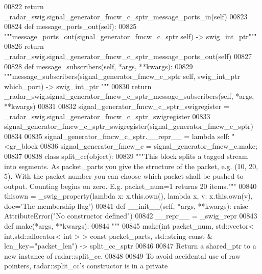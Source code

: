 \begin{DoxyCode}
{{{{00822         \textcolor{keywordflow}{return} \_radar\_swig.signal\_generator\_fmcw\_c\_sptr\_message\_ports\_in(self)
00823 
00824     \textcolor{keyword}{def }message_ports_out(self):
00825         \textcolor{stringliteral}{"""message\_ports\_out(signal\_generator\_fmcw\_c\_sptr self) -> swig\_int\_ptr"""}
00826         \textcolor{keywordflow}{return} \_radar\_swig.signal\_generator\_fmcw\_c\_sptr\_message\_ports\_out(self)
00827 
00828     \textcolor{keyword}{def }message_subscribers(self, *args, **kwargs):
00829         \textcolor{stringliteral}{"""message\_subscribers(signal\_generator\_fmcw\_c\_sptr self, swig\_int\_ptr which\_port) -> swig\_int\_ptr
      """}
00830         \textcolor{keywordflow}{return} \_radar\_swig.signal\_generator\_fmcw\_c\_sptr\_message\_subscribers(self, *args, **kwargs)
00831 
00832 signal\_generator\_fmcw\_c\_sptr\_swigregister = \_radar\_swig.signal\_generator\_fmcw\_c\_sptr\_swigregister
00833 signal_generator_fmcw_c_sptr_swigregister(signal\_generator\_fmcw\_c\_sptr)
00834 
00835 signal\_generator\_fmcw\_c\_sptr.\_\_repr\_\_ = \textcolor{keyword}{lambda} self: \textcolor{stringliteral}{"<gr\_block %
00836 signal\_generator\_fmcw\_c = signal\_generator\_fmcw\_c.make;
00837 
00838 \textcolor{keyword}{class }split_cc(object):
00839     \textcolor{stringliteral}{"""This block splits a tagged stream into segments. As packet\_parts you give the structure of the
       packet, e.g. (10, 20, 5). With the packet number you can choose which packet shall be pushed to output. Counting
       begins on zero. E.g. packet\_num=1 returns 20 items."""}
00840     thisown = _swig_property(\textcolor{keyword}{lambda} x: x.this.own(), \textcolor{keyword}{lambda} x, v: x.this.own(v), doc=\textcolor{stringliteral}{'The membership flag'})
00841     \textcolor{keyword}{def }__init__(self, *args, **kwargs): \textcolor{keywordflow}{raise} AttributeError(\textcolor{stringliteral}{"No constructor defined"})
00842     \_\_repr\_\_ = \_swig\_repr
00843     \textcolor{keyword}{def }make(*args, **kwargs):
00844         \textcolor{stringliteral}{"""}
00845 \textcolor{stringliteral}{        make(int packet\_num, std::vector< int,std::allocator< int > > const packet\_parts, std::string const
       & len\_key="packet\_len") -> split\_cc\_sptr}
00846 \textcolor{stringliteral}{}
00847 \textcolor{stringliteral}{        Return a shared\_ptr to a new instance of radar::split\_cc.}
00848 \textcolor{stringliteral}{}
00849 \textcolor{stringliteral}{        To avoid accidental use of raw pointers, radar::split\_cc's constructor is in a private
}}}}}}
\end{DoxyCode}
